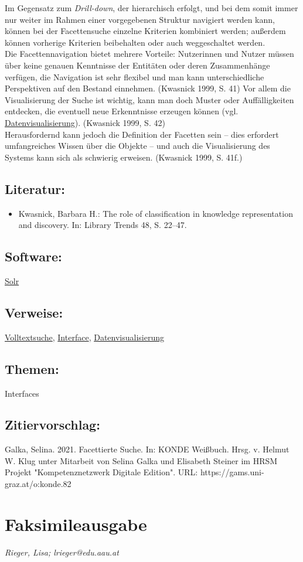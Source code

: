 \documentclass{article}
\begin{document}
        Im Gegensatz zum \emph{Drill-down}, der hierarchisch erfolgt, und bei dem somit immer nur weiter im Rahmen einer vorgegebenen Struktur navigiert werden kann, können bei der Facettensuche einzelne Kriterien kombiniert werden; außerdem können vorherige Kriterien beibehalten oder auch weggeschaltet werden.\\
            
        Die Facettennavigation bietet mehrere Vorteile: Nutzerinnen und Nutzer müssen über keine genauen Kenntnisse der Entitäten oder deren Zusammenhänge verfügen, die Navigation ist sehr flexibel und man kann unterschiedliche Perspektiven auf den Bestand einnehmen. (Kwasnick 1999, S. 41) Vor allem die Visualisierung der Suche ist wichtig, kann man doch Muster oder Auffälligkeiten entdecken, die eventuell neue Erkenntnisse erzeugen können (vgl. \href{http://gams.uni-graz.at/o:konde.54}{Datenvisualisierung}). (Kwasnick 1999, S. 42)\\
            
        Herausfordernd kann jedoch die Definition der Facetten sein – dies erfordert umfangreiches Wissen über die Objekte – und auch die Visualisierung des Systems kann sich als schwierig erweisen. (Kwasnick 1999, S. 41f.)\\
            
        \subsection*{Literatur:}\begin{itemize}\item Kwasnick, Barbara H.: The role of classification in knowledge representation and discovery. In: Library Trends 48, S. 22–47.\end{itemize}\subsection*{Software:}\href{http://lucene.apache.org/solr/}{Solr}\subsection*{Verweise:}\href{https://gams.uni-graz.at/o:konde.211}{Volltextsuche}, \href{https://gams.uni-graz.at/o:konde.98}{Interface}, \href{https://gams.uni-graz.at/o:konde.54}{Datenvisualisierung}\subsection*{Themen:}Interfaces\subsection*{Zitiervorschlag:}Galka, Selina. 2021. Facettierte Suche. In: KONDE Weißbuch. Hrsg. v. Helmut W. Klug unter Mitarbeit von Selina Galka und Elisabeth Steiner im HRSM Projekt "Kompetenznetzwerk Digitale Edition". URL: https://gams.uni-graz.at/o:konde.82\newpage\section*{Faksimileausgabe} \emph{Rieger, Lisa; lrieger@edu.aau.at }\\
        
\end{document}
